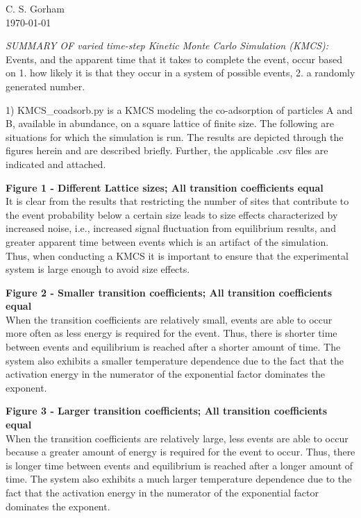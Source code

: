 \documentclass[11pt]{article}
\begin{document}
C. S. Gorham\\
\today

\emph{SUMMARY OF varied time-step Kinetic Monte Carlo Simulation (KMCS):} Events, and the apparent time that it takes to complete the event, occur based on 1. how likely it is that they occur in a system of possible events, 2. a randomly generated number. 

1) KMCS\_coadsorb.py is a KMCS modeling the co-adsorption of  particles A and B, available in abundance, on a square lattice of finite size. The following are situations for which the simulation is run. The results are depicted through the figures herein and are described briefly. Further, the applicable .csv files are indicated and attached. 

{\bf{Figure 1 - Different Lattice sizes; All transition coefficients equal}}\\
\hspace*{1cm}It is clear from the results that restricting the number of sites that contribute to the event probability below a certain size leads to size effects characterized by increased noise, i.e., increased signal fluctuation from equilibrium results, and greater apparent time between events which is an artifact of the simulation. Thus, when conducting a KMCS it is important to ensure that the experimental system is large enough to avoid size effects. 


{\bf{ Figure 2 - Smaller transition coefficients; All transition coefficients equal }} \\
\hspace*{1cm}When the transition coefficients are relatively small, events are able to occur more often as less energy is required for the event. Thus, there is shorter time between events and equilibrium is reached after a shorter amount of time. The system also exhibits a smaller temperature dependence due to the fact that the activation energy in the numerator of the exponential factor dominates the exponent.


{\bf{Figure 3 - Larger transition coefficients; All transition coefficients equal}}\\
\hspace*{1cm}When the transition coefficients are relatively large, less events are able to occur because a greater amount of energy is required for the event to occur. Thus, there is longer time between events and equilibrium is reached after a longer amount of time. The system also exhibits a much larger temperature dependence due to the fact that the activation energy in the numerator of the exponential factor dominates the exponent.
\end{document}
